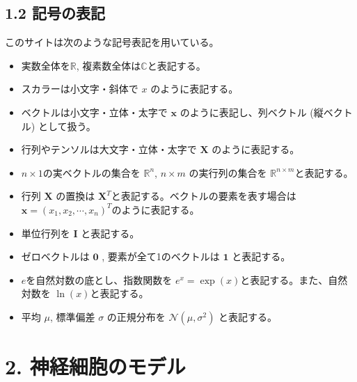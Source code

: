 \documentclass[letterpaper,10pt,english]{sphinxmanual}
\begin{document}
\subsection{1.2 記号の表記}
\label{\detokenize{notation:id1}}\label{\detokenize{notation::doc}}
このサイトは次のような記号表記を用いている。
\begin{itemize}
\item {} 
実数全体を\(\mathbb{R}\), 複素数全体は\(\mathbb{C}\)と表記する。

\item {} 
スカラーは小文字・斜体で \(x\) のように表記する。

\item {} 
ベクトルは小文字・立体・太字で \(\mathbf{x}\) のように表記し、列ベクトル (縦ベクトル) として扱う。

\item {} 
行列やテンソルは大文字・立体・太字で \(\mathbf{X}\) のように表記する。

\item {} 
\(n\times 1\)の実ベクトルの集合を \(\mathbb{R}^n\), \(n\times m\) の実行列の集合を \(\mathbb{R}^{n\times m}\)と表記する。

\item {} 
行列 \(\mathbf{X}\) の置換は \(\mathbf{X}^T\)と表記する。ベクトルの要素を表す場合は \(\mathbf{x} = (x_1, x_2,\cdots, x_n)^T\)のように表記する。

\item {} 
単位行列を \(\mathbf{I}\) と表記する。

\item {} 
ゼロベクトルは \(\mathbf{0}\) , 要素が全て1のベクトルは \(\mathbf{1}\) と表記する。

\item {} 
\(e\)を自然対数の底とし、指数関数を \(e^x=\exp(x)\)と表記する。また、自然対数を \(\ln(x)\)と表記する。

\item {} 
平均 \(\mu\), 標準偏差 \(\sigma\) の正規分布を \(\mathcal{N}(\mu, \sigma^2)\) と表記する。

\end{itemize}


\section{2. 神経細胞のモデル}
\label{\detokenize{2_intro:id1}}\label{\detokenize{2_intro::doc}}
\end{document}
